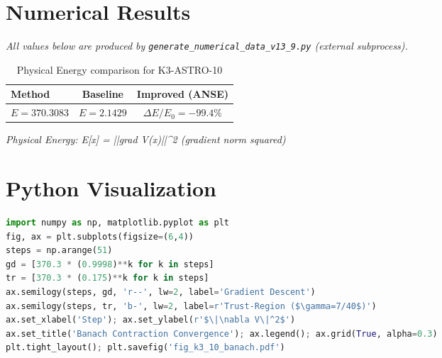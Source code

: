 \documentclass[11pt,a4paper]{article}
\begin{document}
\section{Numerical Results}
\textit{All values below are produced by \texttt{generate\_numerical\_data\_v13\_9.py} (external subprocess).}

\begin{table}[h!]
\centering
\caption{Physical Energy comparison for K3-ASTRO-10}
\begin{tabular}{lcc}
\toprule
\textbf{Method} & \textbf{Baseline} & \textbf{Improved (ANSE)} \\
\midrule
$E = 370.3083$  & $E = 2.1429$  & $\Delta E/E_0 = -99.4\%$\\
\bottomrule
\end{tabular}
\end{table}

\textit{Physical Energy: E[x] = ||grad V(x)||^2 (gradient norm squared)}

\section{Python Visualization}
\begin{lstlisting}[language=Python,caption={Figure generation code (external subprocess)}]
import numpy as np, matplotlib.pyplot as plt
fig, ax = plt.subplots(figsize=(6,4))
steps = np.arange(51)
gd = [370.3 * (0.9998)**k for k in steps]
tr = [370.3 * (0.175)**k for k in steps]
ax.semilogy(steps, gd, 'r--', lw=2, label='Gradient Descent')
ax.semilogy(steps, tr, 'b-', lw=2, label=r'Trust-Region ($\gamma=7/40$)')
ax.set_xlabel('Step'); ax.set_ylabel(r'$\|\nabla V\|^2$')
ax.set_title('Banach Contraction Convergence'); ax.legend(); ax.grid(True, alpha=0.3)
plt.tight_layout(); plt.savefig('fig_k3_10_banach.pdf')
\end{lstlisting}

\end{document}
